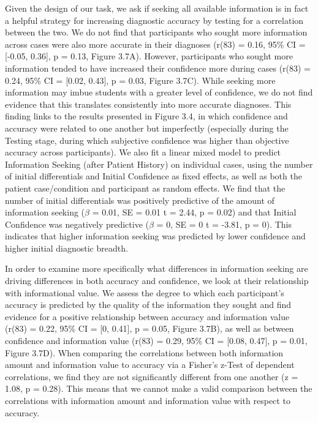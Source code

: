 \documentclass[a4paper, nobind]{templates/ociamthesis}
\begin{document}
Given the design of our task, we ask if seeking all available information is in fact a helpful strategy for increasing diagnostic accuracy by testing for a correlation between the two. We do not find that participants who sought more information across cases were also more accurate in their diagnoses (r(83) = 0.16, 95\% CI = {[}-0.05, 0.36{]}, p = 0.13, Figure 3.7A). However, participants who sought more information tended to have increased their confidence more during cases (r(83) = 0.24, 95\% CI = {[}0.02, 0.43{]}, p = 0.03, Figure 3.7C). While seeking more information may imbue students with a greater level of confidence, we do not find evidence that this translates consistently into more accurate diagnoses. This finding links to the results presented in Figure 3.4, in which confidence and accuracy were related to one another but imperfectly (especially during the Testing stage, during which subjective confidence was higher than objective accuracy across participants). We also fit a linear mixed model to predict Information Seeking (after Patient History) on individual cases, using the number of initial differentials and Initial Confidence as fixed effects, as well as both the patient case/condition and participant as random effects. We find that the number of initial differentials was positively predictive of the amount of information seeking (\(\beta\) = 0.01, SE = 0.01 t = 2.44, p = 0.02) and that Initial Confidence was negatively predictive (\(\beta\) = 0, SE = 0 t = -3.81, p = 0). This indicates that higher information seeking was predicted by lower confidence and higher initial diagnostic breadth.

\hfill\break
In order to examine more specifically what differences in information seeking are driving differences in both accuracy and confidence, we look at their relationship with informational value. We assess the degree to which each participant's accuracy is predicted by the quality of the information they sought and find evidence for a positive relationship between accuracy and information value (r(83) = 0.22, 95\% CI = {[}0, 0.41{]}, p = 0.05, Figure 3.7B), as well as between confidence and information value (r(83) = 0.29, 95\% CI = {[}0.08, 0.47{]}, p = 0.01, Figure 3.7D). When comparing the correlations between both information amount and information value to accuracy via a Fisher's z-Test of dependent correlations, we find they are not significantly different from one another (z = 1.08, p = 0.28). This means that we cannot make a valid comparison between the correlations with information amount and information value with respect to accuracy.
\end{document}
